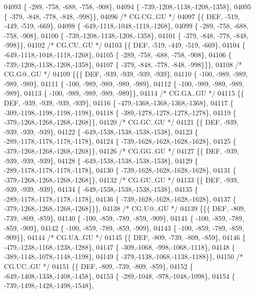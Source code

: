 \begin{DoxyCode}
04093 \{ -289, -758, -688, -758, -908\},
04094 \{ -739,-1208,-1138,-1208,-1358\},
04095 \{ -379, -848, -778, -848, -998\}\},
04096 \textcolor{comment}{/* CG.CG..GU */}
04097 \{\{  DEF, -519, -449, -519, -669\},
04098 \{ -649,-1118,-1048,-1118,-1268\},
04099 \{ -289, -758, -688, -758, -908\},
04100 \{ -739,-1208,-1138,-1208,-1358\},
04101 \{ -379, -848, -778, -848, -998\}\},
04102 \textcolor{comment}{/* CG.CU..GU */}
04103 \{\{  DEF, -519, -449, -519, -669\},
04104 \{ -649,-1118,-1048,-1118,-1268\},
04105 \{ -289, -758, -688, -758, -908\},
04106 \{ -739,-1208,-1138,-1208,-1358\},
04107 \{ -379, -848, -778, -848, -998\}\}\},
04108 \textcolor{comment}{/* CG.G@..GU */}
04109 \{\{\{  DEF, -939, -939, -939, -939\},
04110 \{ -100, -989, -989, -989, -989\},
04111 \{ -100, -989, -989, -989, -989\},
04112 \{ -100, -989, -989, -989, -989\},
04113 \{ -100, -989, -989, -989, -989\}\},
04114 \textcolor{comment}{/* CG.GA..GU */}
04115 \{\{  DEF, -939, -939, -939, -939\},
04116 \{ -479,-1368,-1368,-1368,-1368\},
04117 \{ -309,-1198,-1198,-1198,-1198\},
04118 \{ -389,-1278,-1278,-1278,-1278\},
04119 \{ -379,-1268,-1268,-1268,-1268\}\},
04120 \textcolor{comment}{/* CG.GC..GU */}
04121 \{\{  DEF, -939, -939, -939, -939\},
04122 \{ -649,-1538,-1538,-1538,-1538\},
04123 \{ -289,-1178,-1178,-1178,-1178\},
04124 \{ -739,-1628,-1628,-1628,-1628\},
04125 \{ -379,-1268,-1268,-1268,-1268\}\},
04126 \textcolor{comment}{/* CG.GG..GU */}
04127 \{\{  DEF, -939, -939, -939, -939\},
04128 \{ -649,-1538,-1538,-1538,-1538\},
04129 \{ -289,-1178,-1178,-1178,-1178\},
04130 \{ -739,-1628,-1628,-1628,-1628\},
04131 \{ -379,-1268,-1268,-1268,-1268\}\},
04132 \textcolor{comment}{/* CG.GU..GU */}
04133 \{\{  DEF, -939, -939, -939, -939\},
04134 \{ -649,-1538,-1538,-1538,-1538\},
04135 \{ -289,-1178,-1178,-1178,-1178\},
04136 \{ -739,-1628,-1628,-1628,-1628\},
04137 \{ -379,-1268,-1268,-1268,-1268\}\}\},
04138 \textcolor{comment}{/* CG.U@..GU */}
04139 \{\{\{  DEF, -809, -739, -809, -859\},
04140 \{ -100, -859, -789, -859, -909\},
04141 \{ -100, -859, -789, -859, -909\},
04142 \{ -100, -859, -789, -859, -909\},
04143 \{ -100, -859, -789, -859, -909\}\},
04144 \textcolor{comment}{/* CG.UA..GU */}
04145 \{\{  DEF, -809, -739, -809, -859\},
04146 \{ -479,-1238,-1168,-1238,-1288\},
04147 \{ -309,-1068, -998,-1068,-1118\},
04148 \{ -389,-1148,-1078,-1148,-1198\},
04149 \{ -379,-1138,-1068,-1138,-1188\}\},
04150 \textcolor{comment}{/* CG.UC..GU */}
04151 \{\{  DEF, -809, -739, -809, -859\},
04152 \{ -649,-1408,-1338,-1408,-1458\},
04153 \{ -289,-1048, -978,-1048,-1098\},
04154 \{ -739,-1498,-1428,-1498,-1548\},

\end{DoxyCode}

